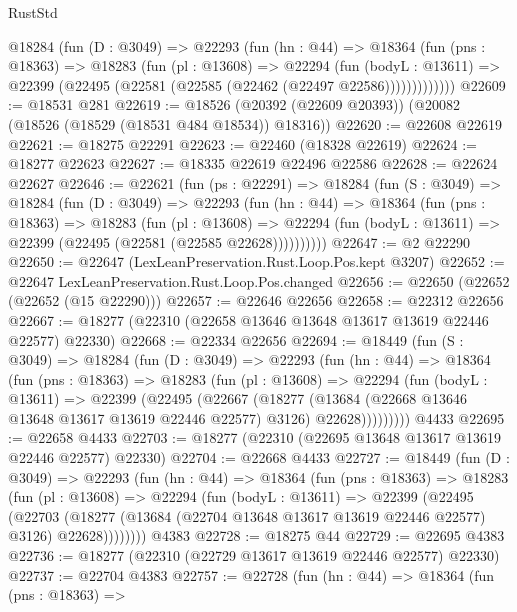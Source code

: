 \begin{lexlean}{RustStd}
\begin{coremodule}
        @18284
          (fun (D : @3049) =>
          @22293
            (fun (hn : @44) =>
            @18364
              (fun (pns : @18363) =>
              @18283
                (fun (pl : @13608) =>
                @22294
                  (fun (bodyL : @13611) =>
                  @22399 (@22495 (@22581 (@22585 (@22462 (@22497 @22586)))))))))))))
@22609 := @18531 @281
@22619 := @18526 (@20392 (@22609 @20393)) (@20082 (@18526 (@18529 (@18531 @484 @18534)) @18316))
@22620 := @22608 @22619
@22621 := @18275 @22291
@22623 := @22460 (@18328 @22619)
@22624 := @18277 @22623
@22627 := @18335 @22619 @22496 @22586
@22628 := @22624 @22627
@22646 := @22621
    (fun (ps : @22291) =>
    @18284
      (fun (S : @3049) =>
      @18284
        (fun (D : @3049) =>
        @22293
          (fun (hn : @44) =>
          @18364
            (fun (pns : @18363) =>
            @18283
              (fun (pl : @13608) =>
              @22294 (fun (bodyL : @13611) => @22399 (@22495 (@22581 (@22585 @22628))))))))))
@22647 := @2 @22290
@22650 := @22647 (LexLeanPreservation.Rust.Loop.Pos.kept @3207)
@22652 := @22647 LexLeanPreservation.Rust.Loop.Pos.changed
@22656 := @22650 (@22652 (@22652 (@15 @22290)))
@22657 := @22646 @22656
@22658 := @22312 @22656
@22667 := @18277 (@22310 (@22658 @13646 @13648 @13617 @13619 @22446 @22577) @22330)
@22668 := @22334 @22656
@22694 := @18449
    (fun (S : @3049) =>
    @18284
      (fun (D : @3049) =>
      @22293
        (fun (hn : @44) =>
        @18364
          (fun (pns : @18363) =>
          @18283
            (fun (pl : @13608) =>
            @22294
              (fun (bodyL : @13611) =>
              @22399
                (@22495
                  (@22667
                    (@18277
                      (@13684 (@22668 @13646 @13648 @13617 @13619 @22446 @22577) @3126)
                      @22628)))))))))
    @4433
@22695 := @22658 @4433
@22703 := @18277 (@22310 (@22695 @13648 @13617 @13619 @22446 @22577) @22330)
@22704 := @22668 @4433
@22727 := @18449
    (fun (D : @3049) =>
    @22293
      (fun (hn : @44) =>
      @18364
        (fun (pns : @18363) =>
        @18283
          (fun (pl : @13608) =>
          @22294
            (fun (bodyL : @13611) =>
            @22399
              (@22495
                (@22703
                  (@18277 (@13684 (@22704 @13648 @13617 @13619 @22446 @22577) @3126) @22628))))))))
    @4383
@22728 := @18275 @44
@22729 := @22695 @4383
@22736 := @18277 (@22310 (@22729 @13617 @13619 @22446 @22577) @22330)
@22737 := @22704 @4383
@22757 := @22728
    (fun (hn : @44) =>
    @18364
      (fun (pns : @18363) =>

\end{coremodule}
\end{lexlean}
